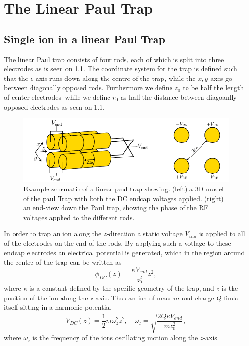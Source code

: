 \chapter{The Linear Paul Trap}
\label{chap:LinTrap}

\section{Single ion in a linear Paul Trap}
The linear Paul trap consists of four rods, each of which is split into three electrodes as is seen on \cref{fig:PaulTrap}. The coordinate system for the trap is defined such that the $z$-axis runs down along the centre of the trap,
while the $x,y$-axes go between diagonally opposed rods. Furthermore we define $z_0$ to be half the length of center electrodes, while we define $r_0$ as half the distance between diagoanlly opposed electrodes as seen on \cref{fig:PaulTrap}.
\begin{figure}
    \includegraphics{main/Paul_Trap.pdf}
    \caption{Example schematic of a linear paul trap showing: (left) a 3D model of the paul Trap with both the DC endcap voltages applied.
    (right) an end-view down the Paul trap, showing the phase of the RF voltages applied to the different rods.}
    \label{fig:PaulTrap}
\end{figure}
In order to trap an ion along the $z$-direction a static voltage $V_{end}$ is applied to all of the electrodes on the end of the rods. By applying such a votlage to these endcap electrodes an electrical potential is generated, which in the region around the centre of the trap can be written as
\begin{equation}
    \phi_{DC}(z) = \frac{\kappa V_{end}}{z_0^2}z^2,
    \label{eq:phi_DC_z} 
\end{equation}
where $\kappa$ is a constant defined by the specific geometry of the trap, and $z$ is the position of the ion along the $z$ axis.
Thus an ion of mass $m$ and charge $Q$ finds itself sitting in a harmonic potential
\begin{equation}
    \label{eq:omega_z}
    V_{DC}(z) = \frac{1}{2}m\omega_z^2 z^2, \quad\omega_z = \sqrt{\frac{2Q\kappa V_{end}}{mz_0^2}},
\end{equation}
where $\omega_z$ is the frequency of the ions oscillating motion along the $z$-axis.

